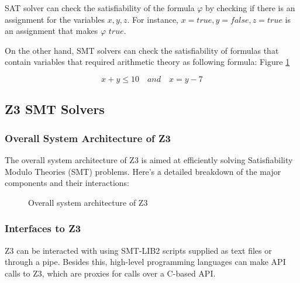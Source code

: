 \documentclass[]{rptuseminar}
\begin{document}
SAT solver can check the satisfiability of the formula \(\varphi\) by checking if there is an assignment for the variables \(x, y, z\).
For instance, \(x = true, y = false, z = true\) is an assignment that makes \(\varphi\) \(true\). 

On the other hand, SMT solvers can check the satisfiability of formulas that contain variables that required arithmetic theory as following formula:
Figure \ref{fig:scholar}

\begin{equation}
  x + y \leq 10 \quad and \quad x = y - 7
\end{equation}

\subsection{Z3 SMT Solvers}
\subsubsection*{Overall System Architecture of Z3}
The overall system architecture of Z3 is aimed at eﬃciently solving Satisfiability Modulo Theories (SMT) problems. Here's a detailed breakdown of the major components and their interactions:

 \begin{figure}[ht]
  \begin{center}
  \end{center}
  \caption{%
     Overall system architecture of Z3
    \cite{nikolaj_bjorner_programming_nodate}
  }
  \label{fig:scholar} %
\end{figure}

\subsubsection{Interfaces to Z3}
Z3 can be interacted with using SMT-LIB2 scripts supplied as text ﬁles or through a pipe.
Besides this, high-level programming languages can make API calls to Z3, which are proxies
for calls over a C-based API.
\cite{nikolaj_bjorner_programming_nodate}
\end{document}
